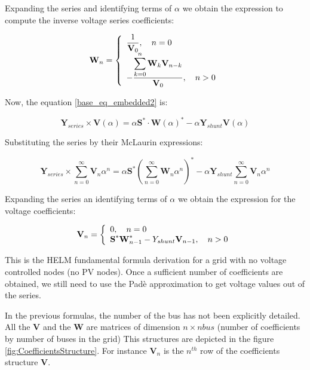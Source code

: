 \documentclass[a4paper,twoside,fleqn]{tufte-book}
\begin{document}
Expanding the series and identifying terms of $\alpha$ we obtain the expression to compute the inverse voltage series coefficients:

\begin{equation}
\textbf{W}_n =
\left\{
\begin{array}{ll}
\mathlarger{\frac{1}{\textbf{V}_0}}, \quad n=0\\
\mathlarger{-\frac{\mathlarger{\sum_{k=0}^{n}\textbf{W}_k \textbf{V}_{n-k}}}{\textbf{V}_0}}, \quad n>0
\end{array}
\right.
\end{equation}


Now, the equation \ref{base_eq_embedded2} is:

\begin{equation}
{\textbf{Y}_{series}\times \textbf{V}( \alpha )} = \alpha\textbf{S}^* \cdot \textbf{W}( \alpha)^*  - \alpha \textbf{Y}_{shunt} \textbf{V}( \alpha )
\label{base_eq_embedded3}
\end{equation}

Substituting the series by their McLaurin expressions:

\begin{equation}
{\textbf{Y}_{series}\times \sum_{n=0}^{\infty}{\textbf{V}_n \alpha^n}} = \alpha\textbf{S}^* \left(\sum_{n=0}^{\infty}{\textbf{W}_n \alpha^n}\right)^*  - \alpha \textbf{Y}_{shunt} \sum_{n=0}^{\infty}{\textbf{V}_n \alpha^n}
\label{base_eq_embedded4}
\end{equation}

Expanding the series an identifying terms of $\alpha$ we obtain the expression for the voltage coefficients:

\begin{equation}
\textbf{V}_n =
\left\{
\begin{array}{ll}
\mathlarger{0}, \quad n=0\\
\mathlarger{\textbf{S}^* \textbf{W}^*_{n-1} - Y_{shunt} \textbf{V}_{n-1} }, \quad n>0
\end{array}
\right.
\end{equation}

This is the HELM fundamental formula derivation for a grid with no voltage controlled nodes (no PV nodes). Once a sufficient number of coefficients are obtained, we still need to use the Padè approximation to get voltage values out of the series.


In the previous formulas, the number of the bus has not been explicitly detailed. All the $\textbf{V}$ and the $\textbf{W}$ are matrices of dimension $n \times nbus$ (number of coefficients by number of buses in the grid) This structures are depicted in the figure \ref{fig:CoefficientsStructure}. For instance $\textbf{V}_n$ is the $n^{th}$ row of the coefficients structure $\textbf{V}$.
\end{document}
